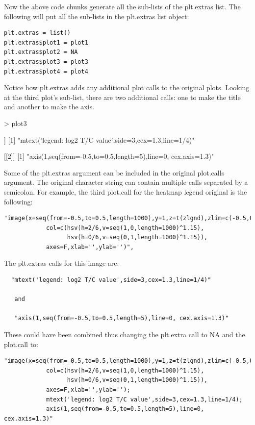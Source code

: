 \documentclass[]{article}
\begin{document}
\indent Now the above code chunks generate all the sub-lists of the plt.extras list. The following will put all the sub-lists in the plt.extras list object:

\begin{verbatim}
plt.extras = list()
plt.extras$plot1 = plot1
plt.extras$plot2 = NA
plt.extras$plot3 = plot3
plt.extras$plot4 = plot4
\end{verbatim}



\indent  Notice how plt.extras adds any additional plot calls to the original plots. Looking at the third plot's sub-list, there are two additional calls: one to make the title and another to make the axis. 

\begin{Schunk}
\begin{Sinput}
> plot3
\end{Sinput}
\begin{Soutput}
[[1]]
[1] "mtext('legend: log2 T/C value',side=3,cex=1.3,line=1/4)"

[[2]]
[1] "axis(1,seq(from=-0.5,to=0.5,length=5),line=0, cex.axis=1.3)"
\end{Soutput}
\end{Schunk}


 Some of the plt.extras argument can be included in the original plot.calls argument. The original character string can contain multiple calls separated by a semicolon. For example, the third plot.call for the heatmap legend original is the following:
  
\begin{verbatim}
"image(x=seq(from=-0.5,to=0.5,length=1000),y=1,z=t(zlgnd),zlim=c(-0.5,0.5),
            col=c(hsv(h=2/6,v=seq(1,0,length=1000)^1.15),
                  hsv(h=0/6,v=seq(0,1,length=1000)^1.15)),
            axes=F,xlab='',ylab='')",
\end{verbatim}

The plt.extras calls for this image are: 
\begin{verbatim}
  "mtext('legend: log2 T/C value',side=3,cex=1.3,line=1/4)"
  
   and 

   "axis(1,seq(from=-0.5,to=0.5,length=5),line=0, cex.axis=1.3)"
\end{verbatim}


\indent These could have been combined thus changing the plt.extra call to NA and the plot.call to:
\begin{verbatim}
"image(x=seq(from=-0.5,to=0.5,length=1000),y=1,z=t(zlgnd),zlim=c(-0.5,0.5),
            col=c(hsv(h=2/6,v=seq(1,0,length=1000)^1.15),
                  hsv(h=0/6,v=seq(0,1,length=1000)^1.15)),
            axes=F,xlab='',ylab=''); 
            mtext('legend: log2 T/C value',side=3,cex=1.3,line=1/4);
            axis(1,seq(from=-0.5,to=0.5,length=5),line=0, cex.axis=1.3)"
\end{verbatim}
\end{document}
